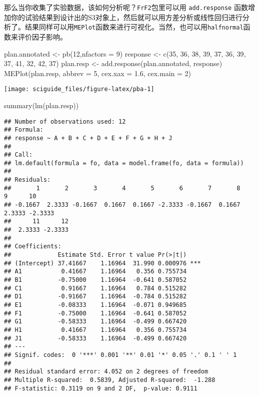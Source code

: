 \documentclass[]{tufte-book}
\newenvironment{Shaded}{}{}
\newcommand{\AttributeTok}[1]{\textcolor[rgb]{0.49,0.56,0.16}{#1}}
\newcommand{\DecValTok}[1]{\textcolor[rgb]{0.25,0.63,0.44}{#1}}
\newcommand{\FloatTok}[1]{\textcolor[rgb]{0.25,0.63,0.44}{#1}}
\newcommand{\FunctionTok}[1]{\textcolor[rgb]{0.02,0.16,0.49}{#1}}
\newcommand{\NormalTok}[1]{#1}
\newcommand{\OtherTok}[1]{\textcolor[rgb]{0.00,0.44,0.13}{#1}}
\begin{document}
那么当你收集了实验数据，该如何分析呢？\texttt{FrF2}包里可以用 \texttt{add.response} 函数增加你的试验结果到设计出的S3对象上，然后就可以用方差分析或线性回归进行分析了。结果同样可以用\texttt{MEPlot}函数来进行可视化。当然，也可以用\texttt{halfnormal}函数来评价因子影响。

\begin{Shaded}
\begin{Highlighting}[]
\NormalTok{plan.annotated }\OtherTok{\textless{}{-}} \FunctionTok{pb}\NormalTok{(}\DecValTok{12}\NormalTok{,}\AttributeTok{nfactors =} \DecValTok{9}\NormalTok{)}
\NormalTok{response }\OtherTok{\textless{}{-}} \FunctionTok{c}\NormalTok{(}\DecValTok{35}\NormalTok{, }\DecValTok{36}\NormalTok{, }\DecValTok{38}\NormalTok{, }\DecValTok{39}\NormalTok{, }\DecValTok{37}\NormalTok{, }\DecValTok{36}\NormalTok{, }\DecValTok{39}\NormalTok{, }\DecValTok{37}\NormalTok{, }\DecValTok{41}\NormalTok{, }\DecValTok{32}\NormalTok{, }\DecValTok{42}\NormalTok{, }\DecValTok{37}\NormalTok{)}
\NormalTok{plan.resp }\OtherTok{\textless{}{-}} \FunctionTok{add.response}\NormalTok{(plan.annotated, response)}
\FunctionTok{MEPlot}\NormalTok{(plan.resp, }\AttributeTok{abbrev =} \DecValTok{5}\NormalTok{, }\AttributeTok{cex.xax =} \FloatTok{1.6}\NormalTok{, }\AttributeTok{cex.main =} \DecValTok{2}\NormalTok{)}
\end{Highlighting}
\end{Shaded}

\texttt{[image: sciguide\_files/figure-latex/pba-1]}

\begin{Shaded}
\begin{Highlighting}[]
\FunctionTok{summary}\NormalTok{(}\FunctionTok{lm}\NormalTok{(plan.resp))}
\end{Highlighting}
\end{Shaded}

\begin{verbatim}
## Number of observations used: 12 
## Formula:
## response ~ A + B + C + D + E + F + G + H + J
## 
## Call:
## lm.default(formula = fo, data = model.frame(fo, data = formula))
## 
## Residuals:
##       1       2       3       4       5       6       7       8       9      10 
## -0.1667  2.3333 -0.1667  0.1667  0.1667 -2.3333 -0.1667  0.1667  2.3333 -2.3333 
##      11      12 
##  2.3333 -2.3333 
## 
## Coefficients:
##             Estimate Std. Error t value Pr(>|t|)    
## (Intercept) 37.41667    1.16964  31.990 0.000976 ***
## A1           0.41667    1.16964   0.356 0.755734    
## B1          -0.75000    1.16964  -0.641 0.587052    
## C1           0.91667    1.16964   0.784 0.515282    
## D1          -0.91667    1.16964  -0.784 0.515282    
## E1          -0.08333    1.16964  -0.071 0.949685    
## F1          -0.75000    1.16964  -0.641 0.587052    
## G1          -0.58333    1.16964  -0.499 0.667420    
## H1           0.41667    1.16964   0.356 0.755734    
## J1          -0.58333    1.16964  -0.499 0.667420    
## ---
## Signif. codes:  0 '***' 0.001 '**' 0.01 '*' 0.05 '.' 0.1 ' ' 1
## 
## Residual standard error: 4.052 on 2 degrees of freedom
## Multiple R-squared:  0.5839, Adjusted R-squared:  -1.288 
## F-statistic: 0.3119 on 9 and 2 DF,  p-value: 0.9111
\end{verbatim}
\end{document}

